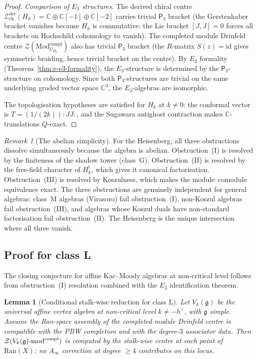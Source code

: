 \documentclass[11pt,reqno]{amsart}
\newtheorem{lemma}[theorem]{Lemma}
\theoremstyle{definition}
\theoremstyle{remark}
\newtheorem{remark}[theorem]{Remark}
\providecommand{\cZ}{\mathcal{Z}}
\providecommand{\fg}{\mathfrak{g}}
\providecommand{\Ran}{\mathrm{Ran}}
\providecommand{\Ainf}{A_\infty}
\providecommand{\Ethree}{E_3}
\providecommand{\Pthree}{\mathsf{P}_3}
\providecommand{\bC}{\mathbb{C}}
\providecommand{\id}{\mathrm{id}}
\begin{document}
\begin{proof}
\emph{Comparison of $\Ethree$ structures.}
The derived chiral centre
$\cZ^{\mathrm{der}}_{\mathrm{ch}}(H_k) = \bC \oplus \bC[-1] \oplus \bC[-2]$
carries trivial $\Pthree$ bracket (the Gerstenhaber
bracket vanishes because $H_k$ is commutative: the Lie
bracket $[J, J] = 0$ forces all brackets on Hochschild
cohomology to vanish). The completed module Drinfeld centre
\(\mathcal Z(\mathrm{Mod}^{\mathrm{compl}}_{U_{H_k}})\) also has
trivial $\Pthree$ bracket
(the $R$-matrix $S(z) = \id$ gives symmetric braiding,
hence trivial bracket on the centre). By $\Ethree$
formality (Theorem~\ref{thm:e-e3-formality}), the
$\Ethree$-structure is determined by the $\Pthree$-structure
on cohomology. Since both $\Pthree$-structures are trivial
on the same underlying graded vector space $\bC^3$, the
$\Ethree$-algebras are isomorphic.

The topologisation hypotheses are satisfied for
$H_k$ at $k \neq 0$: the conformal vector is
$T = (1/(2k)){:}JJ{:}$, and the Sugawara antighost contraction
makes $\bC$-translations $Q$-exact.
\end{proof}

\begin{remark}[The abelian simplicity]
\label{rem:e-abelian-simplicity}
For the Heisenberg, all three obstructions dissolve
simultaneously because the algebra is abelian. Obstruction~(I)
is resolved by the finiteness of the shadow tower (class~G).
Obstruction~(II) is resolved by the free-field character of
$H_k^!$, which gives it canonical factorisation. Obstruction~(III)
is resolved by Koszulness, which makes the module--comodule
equivalence exact. The three obstructions are genuinely independent
for general algebras: class~M algebras (Virasoro) fail
obstruction~(I), non-Koszul algebras fail obstruction~(III), and
algebras whose Koszul duals have non-standard factorisation fail
obstruction~(II). The Heisenberg is the unique intersection where
all three vanish.
\end{remark}

\subsection{Proof for class L}

The closing conjecture for affine Kac--Moody algebras at
non-critical level follows from obstruction~(I) resolution
combined with the $\Ethree$ identification theorem.

\begin{lemma}[Conditional stalk-wise reduction for class L]
\label{lem:e-km-stalkwise}
Let $V_k(\fg)$ be the universal affine vertex algebra at
non-critical level $k \neq -h^\vee$, with $\fg$ simple. Assume the
Ran-space assembly of the completed module Drinfeld centre is
compatible with the PBW completion and with the degree-\(3\)
associator data. Then
\(\mathcal Z(V_k(\fg)\textup{-mod}^{\mathrm{compl}})\) is computed by
the stalk-wise centre at each point of \(\Ran(X)\): no \(\Ainf\)
correction at degree \(\ge 4\) contributes on this locus.
\end{lemma}
\end{document}
